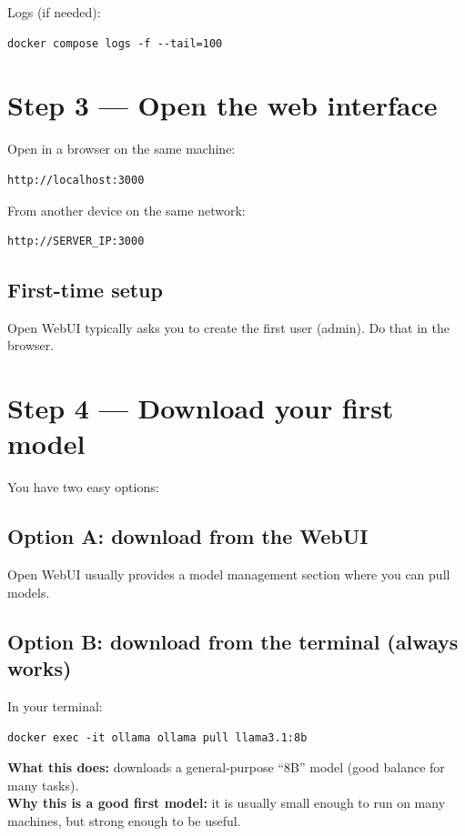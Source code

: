 Logs (if needed):

\begin{lstlisting}
docker compose logs -f --tail=100
\end{lstlisting}

\section{Step 3 --- Open the web interface}
Open in a browser on the same machine:

\begin{lstlisting}
http://localhost:3000
\end{lstlisting}

From another device on the same network:

\begin{lstlisting}
http://SERVER_IP:3000
\end{lstlisting}

\subsection*{First-time setup}
Open WebUI typically asks you to create the first user (admin).
Do that in the browser.


\section{Step 4 --- Download your first model}
You have two easy options:

\subsection*{Option A: download from the WebUI}
Open WebUI usually provides a model management section where you can pull models.

\subsection*{Option B: download from the terminal (always works)}
In your terminal:

\begin{lstlisting}
docker exec -it ollama ollama pull llama3.1:8b
\end{lstlisting}

\textbf{What this does:} downloads a general-purpose ``8B'' model (good balance for many tasks). \\
\textbf{Why this is a good first model:} it is usually small enough to run on many machines, but strong enough to be useful.

